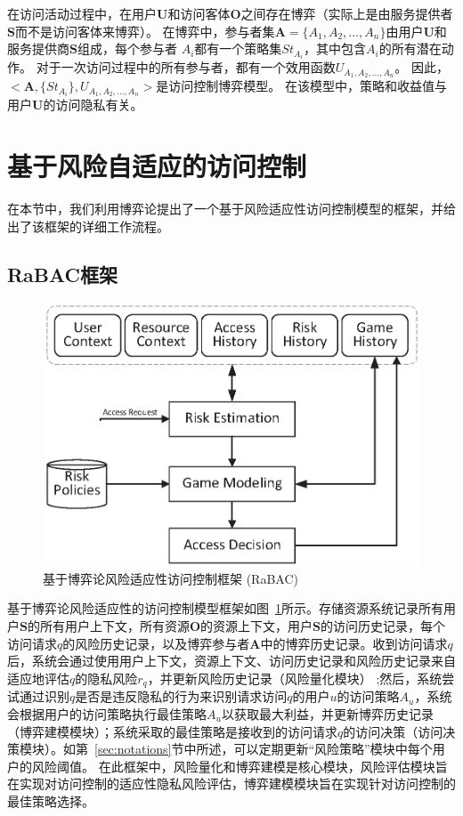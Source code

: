 在访问活动过程中，在用户$\mathbf{U}$和访问客体$\mathbf{O}$之间存在博弈（实际上是由服务提供者$\mathbf{S}$而不是访问客体来博弈）。 在博弈中，参与者集$\mathbf{A}=\{A_1,A_2,...,A_n\}$由用户$\mathbf{U}$和服务提供商$\mathbf{S}$组成，每个参与者 $A_i$都有一个策略集$St_{A_i}$，其中包含$A_i$的所有潜在动作。 对于一次访问过程中的所有参与者，都有一个效用函数$U_{A_1,A_2,...,A_n}$。 因此，$<\mathbf{A},\{St_{A_i}\},U_{A_1,A_2,...,A_n}>$是访问控制博弈模型。 在该模型中，策略和收益值与用户$\mathbf{U}$的访问隐私有关。

\section{基于风险自适应的访问控制}
\label{sec:framework}


在本节中，我们利用博弈论提出了一个基于风险适应性访问控制模型的框架，并给出了该框架的详细工作流程。
\subsection{RaBAC框架}
\label{sec:hlframework}

\begin{figure}[htb]
	\centering
	\includegraphics[width=.85\textwidth]{./figures/game-rbac-framework.eps}
	\caption{基于博弈论风险适应性访问控制框架 (RaBAC)}\label{fig:game-rbac-framework}
\end{figure}



基于博弈论风险适应性的访问控制模型框架如图~\ref{fig:game-rbac-framework}所示。存储资源系统记录所有用户$\mathbf{S}$的所有用户上下文，所有资源$\mathbf{O}$的资源上下文，用户$\mathbf{S}$的访问历史记录，每个访问请求$q$的风险历史记录，以及博弈参与者$\mathbf{A}$中的博弈历史记录。收到访问请求$q$后，系统会通过使用用户上下文，资源上下文、访问历史记录和风险历史记录来自适应地评估$q$的隐私风险$r_q$，并更新风险历史记录（风险量化模块） ;然后，系统尝试通过识别$q$是否是违反隐私的行为来识别请求访问$q$的用户$u$的访问策略$A_u$，系统会根据用户的访问策略执行最佳策略$A_u$以获取最大利益，并更新博弈历史记录（博弈建模模块）；系统采取的最佳策略是接收到的访问请求$q$的访问决策（访问决策模块）。如第~\ref{sec:notations}节中所述，可以定期更新“风险策略”模块中每个用户的风险阈值。
在此框架中，风险量化和博弈建模是核心模块，风险评估模块旨在实现对访问控制的适应性隐私风险评估，博弈建模模块旨在实现针对访问控制的最佳策略选择。


